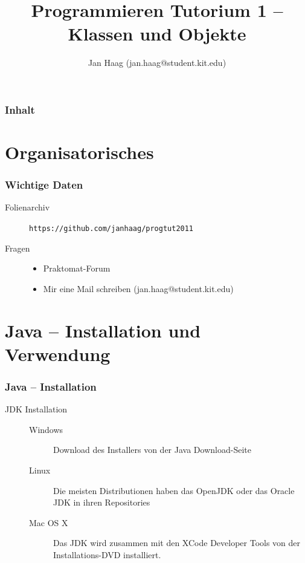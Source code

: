 \documentclass{beamer}
\author{Jan Haag (jan.haag@student.kit.edu)}
\title{Programmieren Tutorium 1 -- Klassen und Objekte}
\institute{Institut f\"{u}r Zeritfizierbare und Vertrauensw\"{u}rdige Informatiksysteme (ZVI)}
\begin{document}
\begin{frame}
\maketitle
\end{frame}

\begin{frame}
\frametitle{Inhalt}
\tableofcontents
\end{frame}

\section{Organisatorisches}
\begin{frame}[fragile]
\frametitle{Wichtige Daten}
\begin{description}
\item[Folienarchiv] \verb|https://github.com/janhaag/progtut2011|
\item[Fragen]
\begin{itemize}
\item Praktomat-Forum
\item Mir eine Mail schreiben (jan.haag@student.kit.edu)
\end{itemize}
\end{description}
\end{frame}

\section{Java -- Installation und Verwendung}
\begin{frame}[fragile]
\frametitle{Java -- Installation}
\begin{description}
\item[JDK Installation]
\begin{description}
\item[Windows] Download des Installers von der Java Download-Seite
\item[Linux] Die meisten Distributionen haben das OpenJDK oder das Oracle JDK in ihren Repositories
\item[Mac OS X] Das JDK wird zusammen mit den XCode Developer Tools von der Installations-DVD installiert.
\end{description}
\end{description}
\end{frame}
\end{document}
